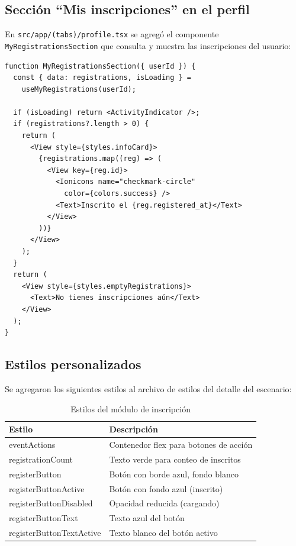 \subsection{Secci\'on ``Mis inscripciones'' en el perfil}

En \texttt{src/app/(tabs)/profile.tsx} se agreg\'o el componente
\texttt{MyRegistrationsSection} que consulta y muestra las
inscripciones del usuario:

\begin{verbatim}
function MyRegistrationsSection({ userId }) {
  const { data: registrations, isLoading } =
    useMyRegistrations(userId);

  if (isLoading) return <ActivityIndicator />;
  if (registrations?.length > 0) {
    return (
      <View style={styles.infoCard}>
        {registrations.map((reg) => (
          <View key={reg.id}>
            <Ionicons name="checkmark-circle"
              color={colors.success} />
            <Text>Inscrito el {reg.registered_at}</Text>
          </View>
        ))}
      </View>
    );
  }
  return (
    <View style={styles.emptyRegistrations}>
      <Text>No tienes inscripciones aún</Text>
    </View>
  );
}
\end{verbatim}

\subsection{Estilos personalizados}

Se agregaron los siguientes estilos al archivo de estilos del
detalle del escenario:

\begin{table}[H]
\centering
\begin{tabular}{@{}ll@{}}
\toprule
\textbf{Estilo} & \textbf{Descripci\'on} \\
\midrule
eventActions & Contenedor flex para botones de acci\'on \\
registrationCount & Texto verde para conteo de inscritos \\
registerButton & Bot\'on con borde azul, fondo blanco \\
registerButtonActive & Bot\'on con fondo azul (inscrito) \\
registerButtonDisabled & Opacidad reducida (cargando) \\
registerButtonText & Texto azul del bot\'on \\
registerButtonTextActive & Texto blanco del bot\'on activo \\
\bottomrule
\end{tabular}
\caption{Estilos del m\'odulo de inscripci\'on}
\end{table}
